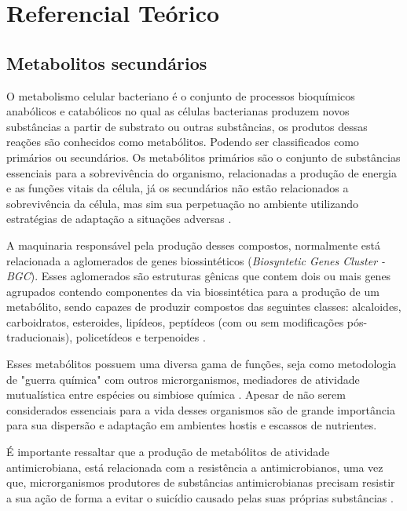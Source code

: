 \chapter{Referencial Teórico}\label{cap:referenciais_teoricos}

\section{Metabolitos secundários}

O metabolismo celular bacteriano é o conjunto de processos bioquímicos anabólicos e catabólicos no qual
as células bacterianas produzem novos substâncias a partir de substrato ou outras substâncias, os produtos
dessas reações são conhecidos como metabólitos. Podendo ser classificados como primários ou secundários.
Os metabólitos primários são o conjunto de substâncias essenciais para a sobrevivência do organismo, relacionadas 
a produção de energia e as funções vitais da célula, já os secundários não estão relacionados a sobrevivência
da célula, mas sim sua perpetuação no ambiente utilizando estratégias de adaptação a situações adversas \cite{gokulan2014}.  

A maquinaria responsável pela produção desses compostos, normalmente está relacionada a aglomerados 
de genes biossintéticos (\textit{Biosyntetic Genes Cluster - BGC}). Esses aglomerados são estruturas gênicas
que contem dois ou mais genes agrupados contendo componentes da via biossintética para a produção de um metabólito, sendo capazes de produzir compostos
das seguintes classes: alcaloides, carboidratos, esteroides, lipídeos, peptídeos (com ou sem modificações pós-traducionais), policetídeos e
terpenoides \cite{medema2015}. 

Esses metabólitos possuem uma diversa gama de funções, seja como metodologia de "guerra
química" com outros microrganismos, mediadores de atividade mutualística entre espécies ou
simbiose química \cite{obrien2011}. Apesar de não serem considerados essenciais para a vida 
desses organismos \cite{demain2009} são de grande importância para sua dispersão e adaptação
em ambientes hostis e escassos de nutrientes. 

É importante ressaltar que a produção de metabólitos de atividade antimicrobiana, está relacionada
com a resistência a antimicrobianos, uma vez que, microrganismos produtores de substâncias antimicrobianas
precisam resistir a sua ação de forma a evitar o suicídio causado pelas suas próprias substâncias \cite{cundliffe2010avoidance}.

